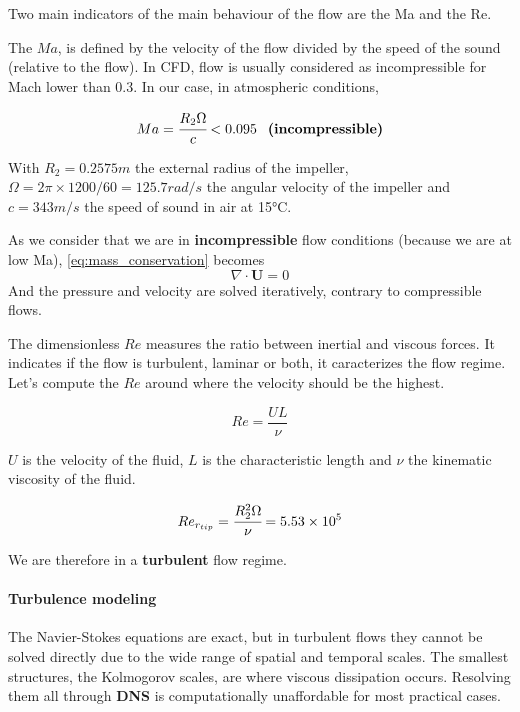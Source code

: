 Two main indicators of the main behaviour of the flow are the \ac{Ma} and the \ac{Re}.

The $Ma$, is defined by the velocity of the flow divided by the speed of the sound (relative to the flow). In CFD, flow is usually considered as incompressible for Mach lower than 0.3.
In our case, in atmospheric conditions,

\begin{equation}
    Ma = \cfrac{R_2 \Omega}{c} < 0.095 \phantom{-} \textrm{\textbf{(incompressible)}}
\end{equation}

With $R_2 = 0.2575m$ the external radius of the impeller, $\Omega = 2\pi \times 1200/60 = 125.7 rad/s$ the angular velocity of the impeller and $c = 343 m/s$ the speed of sound in air at 15°C.

As we consider that we are in \textbf{incompressible} flow conditions (because we are at low Ma), \autoref{eq:mass_conservation} becomes
\begin{equation}
    \nabla \cdot \mathbf{U} = 0
\end{equation}
And the pressure and velocity are solved iteratively, contrary to compressible flows.

The dimensionless $Re$ measures the ratio between inertial and viscous forces. It indicates if the flow is turbulent, laminar or both, it caracterizes the flow regime. 
Let's compute the $Re$ around where the velocity should be the highest.

\begin{equation}
    Re = \frac{UL}{\nu}
\end{equation}

$U$ is the velocity of the fluid, $L$ is the characteristic length and $\nu$ the kinematic viscosity of the fluid.

\begin{equation}
    Re_{r_{tip}}=\cfrac{R_2^2 \Omega}{\nu} = 5.53\times10^5
\end{equation}

We are therefore in a \textbf{turbulent} flow regime.

\paragraph{Turbulence modeling}  
The Navier-Stokes equations are exact, but in turbulent flows they cannot be solved directly due to the wide range of spatial and temporal scales. The smallest structures, the Kolmogorov scales, are where viscous dissipation occurs. Resolving them all through \textbf{DNS} is computationally unaffordable for most practical cases.  

